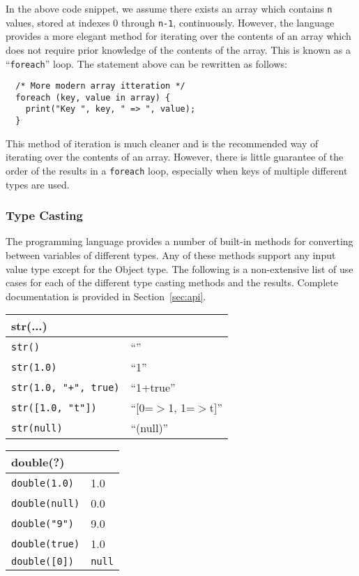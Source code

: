 In the above code snippet, we assume there exists an array which contains
{\tt n} values, stored at indexes 0 through {\tt n-1}, continuously. However, 
the language provides a more elegant method for iterating over the contents 
of an array which does not require prior knowledge of the contents of the array. 
This is known as a ``{\tt foreach}'' loop. The statement above can be rewritten 
as follows:

\lstset{language=LQX}
\begin{lstlisting}  
  /* More modern array itteration */
  foreach (key, value in array) {
    print("Key ", key, " => ", value);
  } 
\end{lstlisting}

This method of iteration is much cleaner and is the recommended way of
iterating over the contents of an array. However, there is little guarantee
of the order of the results in a {\tt foreach} loop, especially when keys
of multiple different types are used.

\subsubsection{Type Casting}

The \ModLang programming language provides a number of built-in methods for
converting between variables of different types. Any of these methods support
any input value type except for the Object type. The following is a non-extensive
list of use cases for each of the different type casting methods and the
results. Complete documentation is provided in Section~\ref{sec:api}.

\begin{multicols}{2}
  \begin{center}
    \begin{tabular}{|p{1.7in}|p{1.0in}|}
      \hline
      \multicolumn{2}{|l|}{\textbf{str(...)}}\\
      \hline
      {\tt str()} & ``'' \\
      {\tt str(1.0)} & ``1'' \\
      {\tt str(1.0, "+", true)} & ``1+true'' \\
      {\tt str([1.0, "t"])} & ``[0=$>$1, 1=$>$t]''\\
      {\tt str(null)} & ``(null)''\\
      \hline
    \end{tabular}
  \end{center}
  \begin{center}
    \begin{tabular}{|p{1.7in}|p{1.0in}|}
      \hline
      \multicolumn{2}{|l|}{\textbf{double(?)}}\\
      \hline
      {\tt double(1.0)} & 1.0\\
      {\tt double(null)}& 0.0\\
      {\tt double("9")} & 9.0\\
      {\tt double(true)}& 1.0\\
      {\tt double([0])} & {\tt null}\\
      \hline
    \end{tabular}
  \end{center}
\end{multicols}

